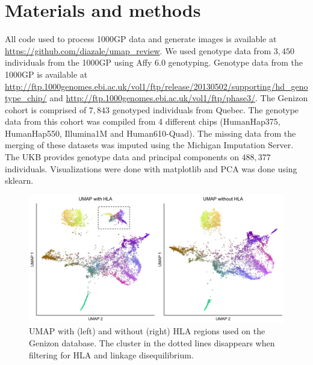 \documentclass[12pt]{article}
\begin{document}
\section*{Materials and methods}
All code used to process 1000GP data and generate images is available at \url{https://github.com/diazale/umap_review}. We used genotype data from $3,450$ individuals from the 1000GP using Affy 6.0 genotyping\cite{10002015global}. Genotype data from the 1000GP is available at \url{http://ftp.1000genomes.ebi.ac.uk/vol1/ftp/release/20130502/supporting/hd_genotype_chip/} and \url{http://ftp.1000genomes.ebi.ac.uk/vol1/ftp/phase3/}. The Genizon cohort is comprised of $7,843$ genotyped individuals from Quebec. The genotype data from this cohort was compiled from 4 different chips (HumanHap375, HumanHap550, Illumina1M and Human610-Quad). The missing data from the merging of these datasets was imputed using the Michigan Imputation Server.  The UKB provides genotype data and principal components on $488,377$ individuals. Visualizations were done with matplotlib\cite{Hunter2007} and PCA was done using sklearn\cite{scikit-learn}. 


\clearpage

\begin{figure}[h!]
  \centering
    \includegraphics[width=\linewidth]{external_images/umap_hla_comparison_highlighted.jpg}
  \caption{UMAP with (left) and without (right) HLA regions used on the Genizon database. The cluster in the dotted lines disappears when filtering for HLA and linkage disequilibrium.}
  \label{fig:HLA}
\end{figure}

\clearpage
\end{document}
